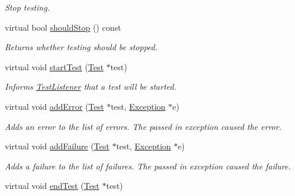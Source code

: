 \begin{DoxyCompactItemize}
\begin{DoxyCompactList}\small\item\em Stop testing. \end{DoxyCompactList}\item 
virtual bool \hyperlink{class_test_result_a20831556df184132ea80836c196ed333}{should\+Stop} () const \hypertarget{class_test_result_a20831556df184132ea80836c196ed333}{}\label{class_test_result_a20831556df184132ea80836c196ed333}

\begin{DoxyCompactList}\small\item\em Returns whether testing should be stopped. \end{DoxyCompactList}\item 
virtual void \hyperlink{class_test_result_a4acd959411284f57a26eefe4c79c30d3}{start\+Test} (\hyperlink{class_test}{Test} $\ast$test)\hypertarget{class_test_result_a4acd959411284f57a26eefe4c79c30d3}{}\label{class_test_result_a4acd959411284f57a26eefe4c79c30d3}

\begin{DoxyCompactList}\small\item\em Informs \hyperlink{class_test_listener}{Test\+Listener} that a test will be started. \end{DoxyCompactList}\item 
virtual void \hyperlink{class_test_result_a25b7f26ec9a52ea4e05b38a490d381c5}{add\+Error} (\hyperlink{class_test}{Test} $\ast$test, \hyperlink{class_exception}{Exception} $\ast$e)\hypertarget{class_test_result_a25b7f26ec9a52ea4e05b38a490d381c5}{}\label{class_test_result_a25b7f26ec9a52ea4e05b38a490d381c5}

\begin{DoxyCompactList}\small\item\em Adds an error to the list of errors. The passed in exception caused the error. \end{DoxyCompactList}\item 
virtual void \hyperlink{class_test_result_a648e7986cd583f7687dfaa88b5b2c080}{add\+Failure} (\hyperlink{class_test}{Test} $\ast$test, \hyperlink{class_exception}{Exception} $\ast$e)\hypertarget{class_test_result_a648e7986cd583f7687dfaa88b5b2c080}{}\label{class_test_result_a648e7986cd583f7687dfaa88b5b2c080}

\begin{DoxyCompactList}\small\item\em Adds a failure to the list of failures. The passed in exception caused the failure. \end{DoxyCompactList}\item 
virtual void \hyperlink{class_test_result_abad5c059d9f01f251057c6065a5c35b3}{end\+Test} (\hyperlink{class_test}{Test} $\ast$test)\hypertarget{class_test_result_abad5c059d9f01f251057c6065a5c35b3}{}\label{class_test_result_abad5c059d9f01f251057c6065a5c35b3}


\end{DoxyCompactItemize}
